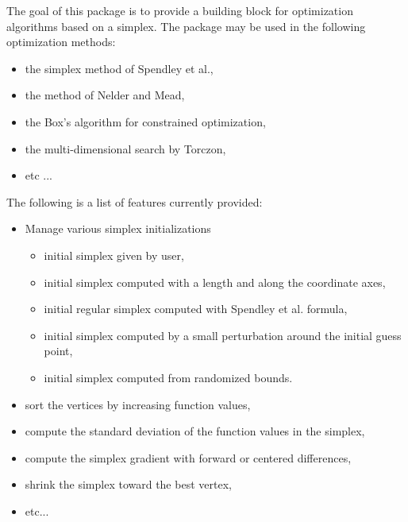 %
\begin{Description}\relax
The goal of this package is to provide a building block for optimization
algorithms based on a simplex. The  package may be used in
the following optimization methods: \begin{itemize}

\item the simplex method of Spendley et al.,
\item the method of Nelder and Mead,
\item the Box's algorithm for constrained optimization,
\item the multi-dimensional search by Torczon,
\item etc ...

\end{itemize}


The following is a list of features currently provided:
\begin{itemize}

\item Manage various simplex initializations \begin{itemize}

\item initial simplex given by user,
\item initial simplex computed with a length and along the coordinate
axes,
\item initial regular simplex computed with Spendley et al. formula,
\item initial simplex computed by a small perturbation around the initial
guess point,
\item initial simplex computed from randomized bounds.

\end{itemize}

\item sort the vertices by increasing function values,
\item compute the standard deviation of the function values in the simplex,
\item compute the simplex gradient with forward or centered differences,
\item shrink the simplex toward the best vertex,
\item etc...

\end{itemize}

\end{Description}
